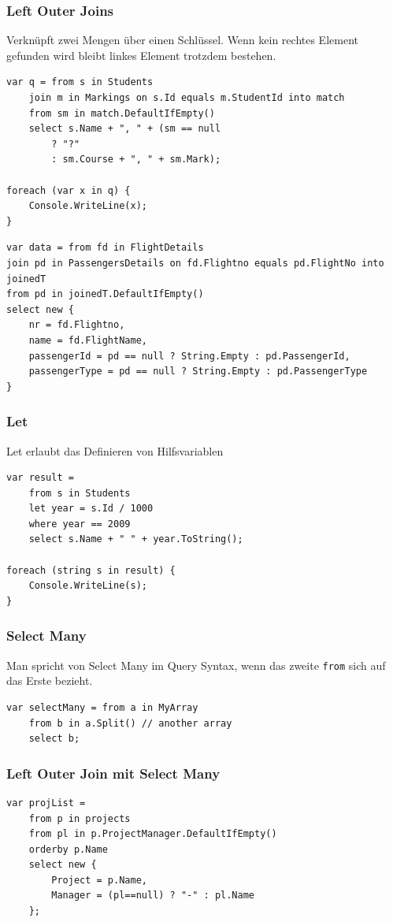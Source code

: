 \documentclass[
a4paper,
oneside,
10pt,
fleqn,
headsepline,
toc=listofnumbered, 
bibliography=totocnumbered]{scrartcl}
\begin{document}
\subsubsection{Left Outer Joins}
Verknüpft zwei Mengen über einen Schlüssel. Wenn kein rechtes Element gefunden wird bleibt linkes Element trotzdem bestehen. 
\begin{lstlisting}
var q = from s in Students
	join m in Markings on s.Id equals m.StudentId into match
	from sm in match.DefaultIfEmpty()
	select s.Name + ", " + (sm == null
		? "?"
		: sm.Course + ", " + sm.Mark);
		
foreach (var x in q) {
	Console.WriteLine(x);
}
\end{lstlisting}

\begin{lstlisting}
var data = from fd in FlightDetails
join pd in PassengersDetails on fd.Flightno equals pd.FlightNo into joinedT
from pd in joinedT.DefaultIfEmpty()
select new {
	nr = fd.Flightno,
	name = fd.FlightName,
	passengerId = pd == null ? String.Empty : pd.PassengerId,
	passengerType = pd == null ? String.Empty : pd.PassengerType
}
\end{lstlisting}

\clearpage

\subsubsection{Let}
Let erlaubt das Definieren von Hilfsvariablen
\begin{lstlisting}
var result =
	from s in Students
	let year = s.Id / 1000
	where year == 2009
	select s.Name + " " + year.ToString();

foreach (string s in result) {
	Console.WriteLine(s);
}
\end{lstlisting}


\subsubsection{Select Many}
Man spricht von Select Many im Query Syntax, wenn das zweite \lstinline|from| sich auf das Erste bezieht.
\begin{lstlisting}
var selectMany = from a in MyArray
	from b in a.Split() // another array
	select b;
\end{lstlisting}

\subsubsection{Left Outer Join mit Select Many}
\begin{lstlisting}
var projList = 
	from p in projects
	from pl in p.ProjectManager.DefaultIfEmpty()
	orderby p.Name
	select new { 
		Project = p.Name,
		Manager = (pl==null) ? "-" : pl.Name 
	};
\end{lstlisting}
\end{document}
